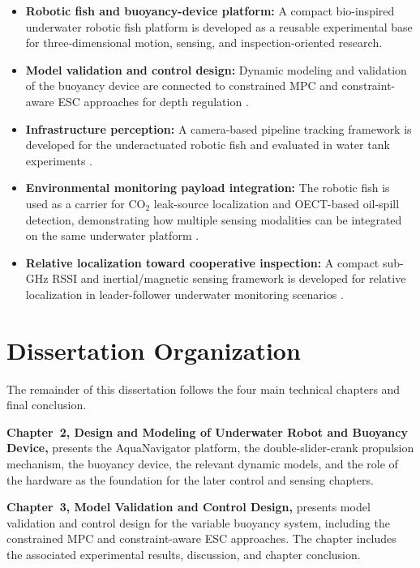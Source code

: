 \documentclass{uhcoethesis}
\begin{document}
\begin{itemize}
\item \textbf{Robotic fish and buoyancy-device platform:} A compact bio-inspired underwater robotic fish platform is developed as a reusable experimental base for three-dimensional motion, sensing, and inspection-oriented research.
\item \textbf{Model validation and control design:} Dynamic modeling and validation of the buoyancy device are connected to constrained MPC and constraint-aware ESC approaches for depth regulation \cite{Masood2023,Masood2026ESCBCD}.
\item \textbf{Infrastructure perception:} A camera-based pipeline tracking framework is developed for the underactuated robotic fish and evaluated in water tank experiments \cite{Masood2025Pipeline}.
\item \textbf{Environmental monitoring payload integration:} The robotic fish is used as a carrier for \mbox{CO$_2$} leak-source localization and OECT-based oil-spill detection, demonstrating how multiple sensing modalities can be integrated on the same underwater platform \cite{Masood2025CO2,Masood2026OilSpill}.
\item \textbf{Relative localization toward cooperative inspection:} A compact sub-GHz RSSI and inertial/magnetic sensing framework is developed for relative localization in leader-follower underwater monitoring scenarios \cite{Masood2026RSSI,Masood2025Swarm}.
\end{itemize}

\section{Dissertation Organization}

The remainder of this dissertation follows the four main technical chapters and final conclusion.

\textbf{Chapter~2, Design and Modeling of Underwater Robot and Buoyancy Device,} presents the AquaNavigator platform, the double-slider-crank propulsion mechanism, the buoyancy device, the relevant dynamic models, and the role of the hardware as the foundation for the later control and sensing chapters.

\textbf{Chapter~3, Model Validation and Control Design,} presents model validation and control design for the variable buoyancy system, including the constrained MPC and constraint-aware ESC approaches. The chapter includes the associated experimental results, discussion, and chapter conclusion.
\end{document}
